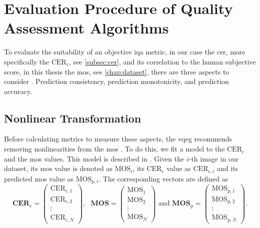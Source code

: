 

\section{Evaluation Procedure of Quality Assessment Algorithms}
\label{sec:evalprocedure}

To evaluate the suitability of an objective \gls{iqa} metric, in our case the \gls{cer}, more specifically the $\text{CER}_{\text{c}}$, see \autoref{subsec:cer}, and its correlation to the human subjective score, in this thesis the \gls{mos}, see \autoref{chap:dataset}, there are three aspects to consider \cite{nonlin_fit_original_2003}\cite{iqa_survey_2020}.
Prediction consistency, prediction monotonicity, and prediction accuracy.

\subsection{Nonlinear Transformation}
\label{subsec:nonlinear}

Before calculating metrics to measure these aspects, the \gls{vqeg} recommends removing nonlinearities from the \gls{mos} \cite{nonlin_fit_original_2003}.
To do this, we fit a model to the $\text{CER}_{\text{c}}$ and the \gls{mos} values.
This model is described in \cite{nonlin_fit_model_init_2000}\cite{nonlin_fit_appl_2017}.
Given the $i$-th image in our dataset, its \gls{mos} value is denoted as $\text{MOS}_{i}$, its $\text{CER}_{\text{c}}$ value as $\text{CER}_{\text{c},i}$ and its predicted \gls{mos} value as $\text{MOS}_{\text{p},i}$.
The corresponding vectors are defined as
\begin{equation}
    \mathbf{CER}_{\text{c}} =
    \begin{pmatrix}
        \text{CER}_{\text{c},1} \\
        \text{CER}_{\text{c},2} \\
        \vdots \\
        \text{CER}_{\text{c},N}
    \end{pmatrix},\text{ }
    \mathbf{MOS} =
    \begin{pmatrix}
        \text{MOS}_{1} \\
        \text{MOS}_{2} \\
        \vdots \\
        \text{MOS}_{N}
    \end{pmatrix} \text{ and }
    \mathbf{MOS}_{\text{p}} =
    \begin{pmatrix}
        \text{MOS}_{\text{p},1} \\
        \text{MOS}_{\text{p},2} \\
        \vdots \\
        \text{MOS}_{\text{p},N}
    \end{pmatrix}.
\end{equation}

